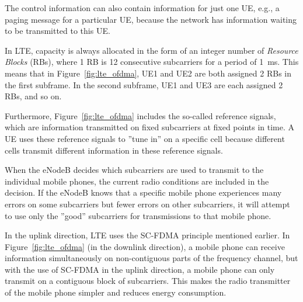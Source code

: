 The control information can also contain information for just one UE, e.g., a paging message for a particular UE, because the network has information waiting to be transmitted to this UE.

In LTE, capacity is always allocated in the form of an integer number of \emph{Resource Blocks} (RBs), where 1 RB is 12 consecutive subcarriers for a period of 1~ms. This means that in Figure~\ref{fig:lte_ofdma}, UE1 and UE2 are both assigned 2 RBs in the first subframe. In the second subframe, UE1 and UE3 are each assigned 2 RBs, and so on.

Furthermore, Figure~\ref{fig:lte_ofdma} includes the so-called reference signals, which are information transmitted on fixed subcarriers at fixed points in time. A UE uses these reference signals to ''tune in'' on a specific cell because different cells transmit different information in these reference signals.

When the eNodeB decides which subcarriers are used to transmit to the individual mobile phones, the current radio conditions are included in the decision. If the eNodeB knows that a specific mobile phone experiences many errors on some subcarriers but fewer errors on other subcarriers, it will attempt to use only the ''good'' subcarriers for transmissions to that mobile phone.

In the uplink direction, LTE uses the SC-FDMA principle mentioned earlier. In Figure~\ref{fig:lte_ofdma} (\ie in the downlink direction), a mobile phone can receive information simultaneously on non-contiguous parts of the frequency channel, but with the use of SC-FDMA in the uplink direction, a mobile phone can only transmit on a contiguous block of subcarriers. This makes the radio transmitter of the mobile phone simpler and reduces energy consumption.

